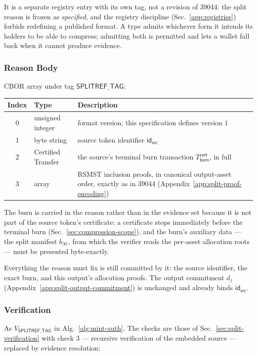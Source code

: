 It is a separate registry entry with its own tag, not a revision of 39044: the split reason is frozen as \emph{specified}, and the registry discipline (Sec.~\ref{app:registries}) forbids redefining a published format. A type admits whichever form it intends its holders to be able to compress; admitting both is permitted and lets a wallet fall back when it cannot produce evidence.

\subsubsection{Reason Body}

CBOR array under tag $\mathsf{SPLITREF\_TAG}$:

\begin{longtable}{clp{8.6cm}}
\textbf{Index} & \textbf{Type} & \textbf{Description} \\
\hline
\endhead
0 & unsigned integer & format version; this specification defines version $1$ \\
1 & byte string & source token identifier $\mathsf{id}_\mathsf{src}$ \\
2 & Certified Transfer & the source's terminal burn transaction $T_\mathsf{burn}^\mathsf{cert}$, in full \\
3 & array & RSMST inclusion proofs, in canonical output-asset order, exactly as in 39044 (Appendix~\ref{app:split-proof-encoding}) \\
\end{longtable}

\noindent The burn is carried in the reason rather than in the evidence set because it is not part of the source token's certificate: a certificate stops immediately before the terminal burn (Sec.~\ref{sec:compression-scope}), and the burn's auxiliary data --- the split manifest $b_\mathcal{M}$, from which the verifier reads the per-asset allocation roots --- must be presented byte-exactly.

Everything the reason must fix is still committed by it: the source identifier, the exact burn, and this output's allocation proofs. The output commitment $d_j$ (Appendix~\ref{app:split-output-commitment}) is unchanged and already binds $\mathsf{id}_\mathsf{src}$.

\subsubsection{Verification}

As $V_{\mathsf{SPLITREF\_TAG}}$ in Alg.~\ref{alg:mint-auth}. The checks are those of Sec.~\ref{sec:split-verification} with check 3 --- recursive verification of the embedded source --- replaced by evidence resolution:

